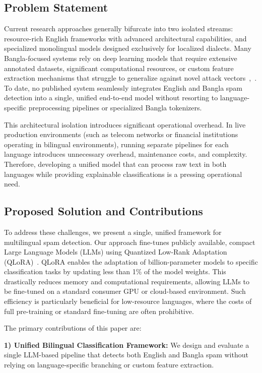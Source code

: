 \documentclass[journal]{IEEEtran}
\begin{document}
\subsection{Problem Statement}

Current research approaches generally bifurcate into two isolated streams: resource-rich English frameworks with advanced architectural capabilities, and specialized monolingual models designed exclusively for localized dialects. Many Bangla-focused systems rely on deep learning models that require extensive annotated datasets, significant computational resources, or custom feature extraction mechanisms that struggle to generalize against novel attack vectors~\cite{ref7},~\cite{ref10}. To date, no published system seamlessly integrates English and Bangla spam detection into a single, unified end-to-end model without resorting to language-specific preprocessing pipelines or specialized Bangla tokenizers.

This architectural isolation introduces significant operational overhead. In live production environments (such as telecom networks or financial institutions operating in bilingual environments), running separate pipelines for each language introduces unnecessary overhead, maintenance costs, and complexity. Therefore, developing a unified model that can process raw text in both languages while providing explainable classifications is a pressing operational need.

\subsection{Proposed Solution and Contributions}

To address these challenges, we present a single, unified framework for multilingual spam detection. Our approach fine-tunes publicly available, compact Large Language Models (LLMs) using Quantized Low-Rank Adaptation (QLoRA)~\cite{ref11}. QLoRA enables the adaptation of billion-parameter models to specific classification tasks by updating less than 1\% of the model weights. This drastically reduces memory and computational requirements, allowing LLMs to be fine-tuned on a standard consumer GPU or cloud-based environment. Such efficiency is particularly beneficial for low-resource languages, where the costs of full pre-training or standard fine-tuning are often prohibitive.

The primary contributions of this paper are:

\textbf{1) Unified Bilingual Classification Framework:} We design and evaluate a single LLM-based pipeline that detects both English and Bangla spam without relying on language-specific branching or custom feature extraction.
\end{document}
